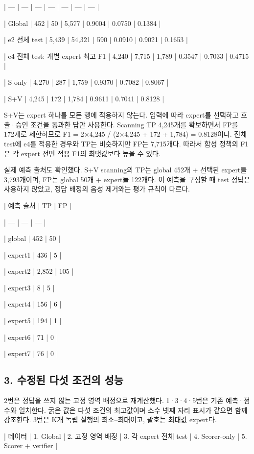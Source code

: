 | --- | --- | --- | --- | --- | --- | --- |

| Global | 452 | 50 | 5,577 | 0.9004 | 0.0750 | 0.1384 |

| e2 전체 test | 5,439 | 54,321 | 590 | 0.0910 | 0.9021 | 0.1653 |

| e4 전체 test: 개별 expert 최고 F1 | 4,240 | 7,715 | 1,789 | 0.3547 | 0.7033 | 0.4715 |

| S-only | 4,270 | 287 | 1,759 | 0.9370 | 0.7082 | 0.8067 |

| S+\allowbreak{}V | 4,245 | 172 | 1,784 | 0.9611 | 0.7041 | 0.8128 |

S+\allowbreak{}V는 expert 하나를 모든 행에 적용하지 않는다. 입력에 따라 expert를 선택하고 호출·승인 조건을 통과한 답만 사용한다. Scanning TP 4,245개를 확보하면서 FP를 172개로 제한하므로 F1 =\allowbreak{} 2×4,245 /\allowbreak{} (2×4,245 +\allowbreak{} 172 +\allowbreak{} 1,784) =\allowbreak{} 0.8128이다. 전체 test에 e4를 적용한 경우와 TP는 비슷하지만 FP는 7,715개다. 따라서 합성 정책의 F1은 각 expert 전면 적용 F1의 최댓값보다 높을 수 있다.

실제 예측 출처도 확인했다. S+\allowbreak{}V scanning의 TP는 global 452개 +\allowbreak{} 선택된 expert들 3,793개이며, FP는 global 50개 +\allowbreak{} expert들 122개다. 이 예측을 구성할 때 test 정답은 사용하지 않았고, 정답 배정의 음성 제거와는 평가 규칙이 다르다.

| 예측 출처 | TP | FP |

| --- | --- | --- |

| global | 452 | 50 |

| expert1 | 436 | 5 |

| expert2 | 2,852 | 105 |

| expert3 | 8 | 5 |

| expert4 | 156 | 6 |

| expert5 | 194 | 1 |

| expert6 | 71 | 0 |

| expert7 | 76 | 0 |

\subsection{3. 수정된 다섯 조건의 성능}
2번은 정답을 쓰지 않는 고정 영역 배정으로 재계산했다. 1·3·4·5번은 기존 예측·점수와 일치한다. 굵은 값은 다섯 조건의 최고값이며 소수 넷째 자리 표시가 같으면 함께 강조한다. 3번은 K개 독립 실행의 최소–최대이고, 괄호는 최대값 expert다.

| 데이터 | 1. Global | 2. 고정 영역 배정 | 3. 각 expert 전체 test | 4. Scorer-only | 5. Scorer +\allowbreak{} verifier |


